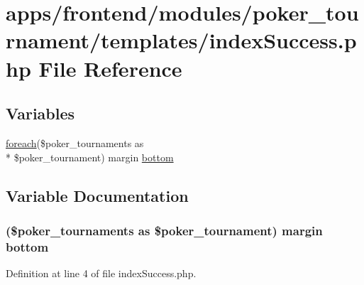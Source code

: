 \hypertarget{frontend_2modules_2poker__tournament_2templates_2index_success_8php}{\section{apps/frontend/modules/poker\-\_\-tournament/templates/index\-Success.php File Reference}
\label{frontend_2modules_2poker__tournament_2templates_2index_success_8php}
}
\subsection*{Variables}
\begin{DoxyCompactItemize}
\item 
\hyperlink{presse_2modules_2news_2templates_2index_success_8php_abc56db52b2e9a59bcd5c9e45ac5cb332}{foreach}(\$poker\-\_\-tournaments as \\*
\$poker\-\_\-tournament) margin \hyperlink{frontend_2modules_2poker__tournament_2templates_2index_success_8php_a4f2cc2ffa048e31814dd7937e46b279d}{bottom}
\end{DoxyCompactItemize}


\subsection{Variable Documentation}
\hypertarget{frontend_2modules_2poker__tournament_2templates_2index_success_8php_a4f2cc2ffa048e31814dd7937e46b279d}{
\subsubsection[{bottom}]{ (\$poker\-\_\-tournaments as \$poker\-\_\-tournament) margin bottom}}\label{frontend_2modules_2poker__tournament_2templates_2index_success_8php_a4f2cc2ffa048e31814dd7937e46b279d}


Definition at line 4 of file index\-Success.\-php.

